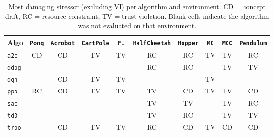 \begin{table}[t]
\centering
\caption{Most damaging stressor (excluding VI) per algorithm and environment. CD = concept drift, RC = resource constraint, TV = trust violation. Blank cells indicate the algorithm was not evaluated on that environment.}
\label{tab:algo_vulnerability}
\setlength{\tabcolsep}{4pt}
\begin{tabular}{lccccccccc}
\toprule
Algo & \texttt{Pong} & \texttt{Acrobot} & \texttt{CartPole} & \texttt{FL} & \texttt{HalfCheetah} & \texttt{Hopper} & \texttt{MC} & \texttt{MCC} & \texttt{Pendulum} \\
\midrule
\texttt{a2c} & CD & CD & TV & TV & RC & RC & TV & TV & RC \\
\texttt{ddpg} & -- & -- & -- & -- & RC & RC & -- & TV & TV \\
\texttt{dqn} & -- & CD & TV & TV & -- & -- & TV & -- & -- \\
\texttt{ppo} & RC & CD & TV & TV & TV & CD & TV & TV & CD \\
\texttt{sac} & -- & -- & -- & -- & TV & TV & -- & TV & RC \\
\texttt{td3} & -- & -- & -- & -- & TV & RC & -- & TV & TV \\
\texttt{trpo} & -- & CD & TV & TV & RC & CD & TV & CD & CD \\
\bottomrule
\end{tabular}
\end{table}
